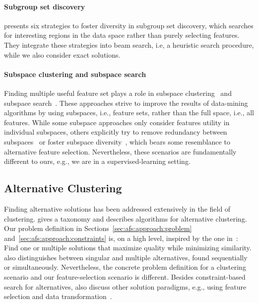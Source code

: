 \documentclass{article}
\theoremstyle{definition}
\begin{document}
\paragraph{Subgroup set discovery}

\cite{leeuwen2012diverse} presents six strategies to foster diversity in subgroup set discovery, which searches for interesting regions in the data space rather than purely selecting features.
They integrate these strategies into beam search, i.e, a heuristic search procedure, while we also consider exact solutions.

\paragraph{Subspace clustering and subspace search}

Finding multiple useful feature set plays a role in subspace clustering~\cite{guan2011unified, hu2018subspace, mueller2009relevant} and subspace search~\cite{fouche2021efficient, nguyen20134s, trittenbach2019dimension}.
These approaches strive to improve the results of data-mining algorithms by using subspaces, i.e., feature sets, rather than the full space, i.e., all features.
While some subspace approaches only consider features utility in individual subspaces, others explicitly try to remove redundancy between subspaces~\cite{mueller2009relevant, nguyen20134s} or foster subspace diversity~\cite{fouche2021efficient, trittenbach2019dimension}, which bears some resemblance to alternative feature selection.
Nevertheless, these scenarios are fundamentally different to ours, e.g., we are in a supervised-learning setting.

\subsection{Alternative Clustering}

Finding alternative solutions has been addressed extensively in the field of clustering.
\cite{bailey2014alternative} gives a taxonomy and describes algorithms for alternative clustering.
Our problem definition in Sections~\ref{sec:afs:approach:problem} and~\ref{sec:afs:approach:constraints} is, on a high level, inspired by the one in~\cite{bailey2014alternative}:
Find one or multiple solutions that maximize quality while minimizing similarity.
\cite{bailey2014alternative} also distinguishes between singular and multiple alternatives, found sequentially or simultaneously.
Nevertheless, the concrete problem definition for a clustering scenario and our feature-selection scenario is different.
Besides constraint-based search for alternatives, \cite{bailey2014alternative} also discuss other solution paradigms, e.g., using feature selection and data transformation~\cite{tao2012novel}.
\end{document}
